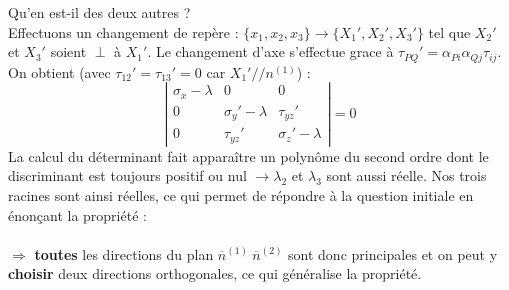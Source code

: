     Qu'en est-il des deux autres ?\\
    Effectuons un changement de repère : $\{x_1,x_2,x_3\}\rightarrow \{X_1',X_2',X_3'\}$ tel que 
    $X_2'$ et $X_3'$ soient $\perp$ à $X_1'$. Le changement d'axe s'effectue grace à $\tau_{PQ}' = \alpha_{Pi}
    \alpha_{Qj}\tau_{ij}$. On obtient (avec $\tau_{12}' = \tau_{13}' = 0$ car $X_1' // n^{(1)}$) :
    \begin{equation}
    \left|\begin{array}{ccc}
    \sigma_x - \lambda      &0                      &0 \\
    0                       &\sigma_y'-\lambda       &\tau_{yz}'\\
    0                       &\tau_{yz}'              &\sigma_z' - \lambda
    \end{array}\right| = 0
    \end{equation}
    La calcul du déterminant fait apparaître un polynôme du second ordre dont le discriminant est toujours
    positif ou nul $\rightarrow \lambda_2$ et $\lambda_3$ sont aussi réelle. Nos trois racines sont ainsi
    réelles, ce qui permet de répondre à la question initiale en énonçant la propriété :\\
    
    \ \\
    $\Rightarrow$ \textbf{toutes} les directions du plan $\overline{n}^{(1)}\ \overline{n}^{(2)}$ sont donc
    principales et on peut y \textbf{choisir} deux directions orthogonales, ce qui généralise la propriété.
    
    

